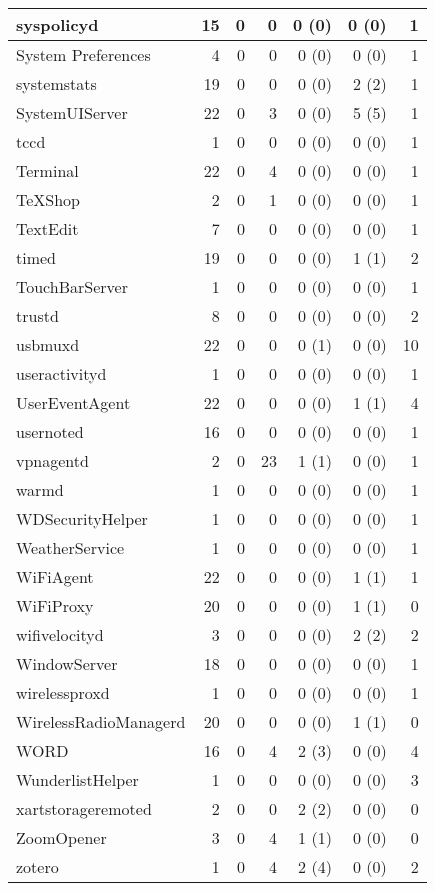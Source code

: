 \begin{adjustwidth}{-2in}{}
\begin{scriptsize}
\begin{longtable}[l]{ l | r | r | r | r | r | r }
    syspolicyd &  15 &  0 &  0 &  0 (0) &  0 (0) &  1 \\ \hline
    System Preferences &  4 &  0 &  0 &  0 (0) &  0 (0) &  1 \\ \hline
    systemstats & 19 &  0 &  0 &  0 (0) &  2 (2) &  1 \\ \hline
    SystemUIServer &  22 &  0 &  3 &  0 (0) &  5 (5) &  1 \\ \hline
    tccd & 1 &  0 &  0 &  0 (0) &  0 (0) &  1 \\ \hline
    Terminal &  22 &  0 &  4 &  0 (0) &  0 (0) &  1 \\ \hline
    TeXShop &  2 &  0 &  1 &  0 (0) &  0 (0) &  1 \\ \hline
    TextEdit & 7 &  0 &  0 &  0 (0) &  0 (0) &  1 \\ \hline
    timed & 19 &  0 &  0 &  0 (0) &  1 (1) &  2 \\ \hline
    TouchBarServer & 1 &  0 &  0 &  0 (0) &  0 (0) &  1 \\ \hline
    trustd & 8 &  0 &  0 &  0 (0) &  0 (0) &  2 \\ \hline
    usbmuxd & 22 &  0 &  0 &  0 (1) &  0 (0) & 10 \\ \hline
    useractivityd &  1 &  0 &  0 &  0 (0) &  0 (0) &  1 \\ \hline
    UserEventAgent &  22 &  0 &  0 &  0 (0) &  1 (1) &  4 \\ \hline
    usernoted & 16 &  0 &  0 &  0 (0) &  0 (0) &  1 \\ \hline
    vpnagentd &  2 &  0 & 23 &  1 (1) &  0 (0) &  1 \\ \hline
    warmd &  1 &  0 &  0 &  0 (0) &  0 (0) &  1 \\ \hline
    WDSecurityHelper & 1 &  0 &  0 &  0 (0) &  0 (0) &  1 \\ \hline
    WeatherService & 1 &  0 &  0 &  0 (0) &  0 (0) &  1 \\ \hline
    WiFiAgent & 22 &  0 &  0 &  0 (0) &  1 (1) &  1 \\ \hline
    WiFiProxy & 20 &  0 &  0 &  0 (0) &  1 (1) &  0 \\ \hline
    wifivelocityd &  3 &  0 &  0 &  0 (0) &  2 (2) &  2 \\ \hline
    WindowServer &  18 &  0 &  0 &  0 (0) &  0 (0) &  1 \\ \hline
    wirelessproxd &  1 &  0 &  0 &  0 (0) &  0 (0) &  1 \\ \hline
    WirelessRadioManagerd & 20 &  0 &  0 &  0 (0) &  1 (1) &  0 \\ \hline
    WORD &  16 &  0 &  4 &  2 (3) &  0 (0) &  4 \\ \hline
    WunderlistHelper & 1 &  0 &  0 &  0 (0) &  0 (0) &  3 \\ \hline
    xartstorageremoted & 2 &  0 &  0 &  2 (2) &  0 (0) &  0 \\ \hline
    ZoomOpener & 3 &  0 &  4 &  1 (1) &  0 (0) &  0 \\ \hline
    zotero & 1 &  0 &  4 &  2 (4) &  0 (0) &  2 \\ \hline


\end{longtable}
\end{scriptsize}
\end{adjustwidth}
